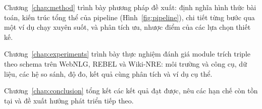 Chương~\ref{chap:method} trình bày phương pháp đề xuất:
định nghĩa hình thức bài toán, kiến trúc tổng thể của pipeline (Hình~\ref{fig:pipeline}),
chi tiết từng bước qua một ví dụ chạy xuyên suốt, và phân tích ưu, nhược điểm của các lựa chọn thiết kế.

Chương~\ref{chap:experiments} trình bày thực nghiệm đánh giá module trích triple theo schema trên WebNLG, REBEL và Wiki-NRE:
môi trường và công cụ, dữ liệu, các hệ so sánh, độ đo, kết quả cùng phân tích và ví dụ cụ thể.

Chương~\ref{chap:conclusion} tổng kết các kết quả đạt được, nêu các hạn chế còn tồn tại và đề xuất hướng phát triển tiếp theo.
